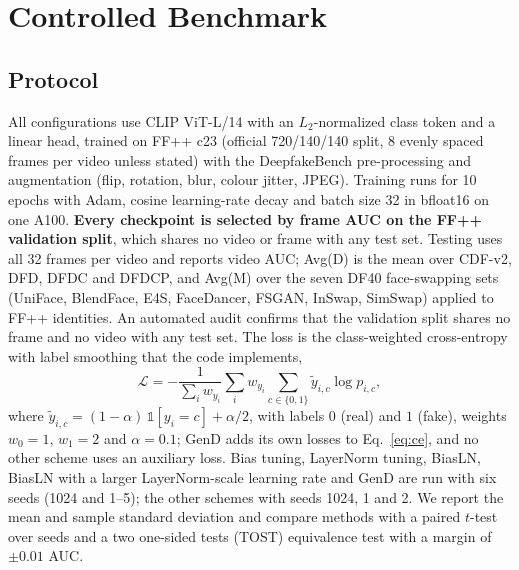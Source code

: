 \documentclass[fonts]{icst}
\begin{document}
\begin{table}[!t]
\centering
\caption{Published video AUC of detectors trained on FF++ c23, as reported by their authors (mostly Table~1 of Effort~\cite{yan2025effort}). Selection rules, frames and seeds differ between rows; the numbers are listed for reference only and are not comparable with Tables~\ref{tab:main}--\ref{tab:perdataM}. $^\dagger$: values reported by Effort.}
\label{tab:literature}
\resizebox{\textwidth}{!}{}
\end{table}

\section{Controlled Benchmark}
\label{sec:bench}

\subsection{Protocol}
\label{sec:protocol}
All configurations use CLIP ViT-L/14 with an $L_2$-normalized class token and a linear head, trained on FF++ c23 (official 720/140/140 split, 8 evenly spaced frames per video unless stated) with the DeepfakeBench pre-processing and augmentation (flip, rotation, blur, colour jitter, JPEG). Training runs for 10 epochs with Adam, cosine learning-rate decay and batch size 32 in bfloat16 on one A100. \textbf{Every checkpoint is selected by frame AUC on the FF++ validation split}, which shares no video or frame with any test set. Testing uses all 32 frames per video and reports video AUC; Avg(D) is the mean over CDF-v2, DFD, DFDC and DFDCP, and Avg(M) over the seven DF40 face-swapping sets (UniFace, BlendFace, E4S, FaceDancer, FSGAN, InSwap, SimSwap) applied to FF++ identities. An automated audit confirms that the validation split shares no frame and no video with any test set. The loss is the class-weighted cross-entropy with label smoothing that the code implements,
\begin{equation}
\mathcal{L}=-\frac{1}{\sum_i w_{y_i}}\sum_{i} w_{y_i}\sum_{c\in\{0,1\}}\tilde{y}_{i,c}\log p_{i,c},
\label{eq:ce}
\end{equation}
where $\tilde{y}_{i,c}=(1-\alpha)\,\mathbb{1}[y_i=c]+\alpha/2$, with labels $0$ (real) and $1$ (fake), weights $w_0=1$, $w_1=2$ and $\alpha=0.1$; GenD adds its own losses to Eq.~\eqref{eq:ce}, and no other scheme uses an auxiliary loss. Bias tuning, LayerNorm tuning, BiasLN, BiasLN with a larger LayerNorm-scale learning rate and GenD are run with six seeds (1024 and 1--5); the other schemes with seeds 1024, 1 and 2. We report the mean and sample standard deviation and compare methods with a paired $t$-test over seeds and a two one-sided tests (TOST) equivalence test with a margin of $\pm0.01$ AUC.
\end{document}
